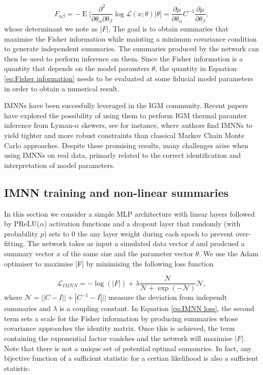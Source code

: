 \begin{equation}\label{eq:Fisher information}
    F_{\alpha \beta} =-\operatorname{E}\bigg[\frac{\partial^2}{\partial\theta_\alpha\partial\theta_\beta}\log \mathcal{L}(x;\theta)\bigg|\theta\bigg]= \frac{\partial \mu}{\partial \theta_\alpha}C^{-1} \frac{\partial \mu}{\partial \theta_\beta},
\end{equation}
whose determinant we note as $|F|$. 
The goal is to obtain summaries that maximise the Fisher information while mainting a minimum covariance condition to generate independent summaries. The summaries produced by the network can then be used to perform inference on them. Since the Fisher information is a quantity that depends on the model paramters $\theta$, the quantity in Equation \ref{eq:Fisher information} needs to be evaluated at some fiducial model parameters in order to obtain a numerical result.

IMNNs have been succesfully leveraged in the IGM community. Recent papers have explored the possibility of using them to perform IGM thermal paramter inference from Lyman-$\alpha$ skewers, see \cite{maitra2024parameterestimationlyalphaforest} for instance, where authors find IMNNs to yield tighter and more robust constraints than classical Markov Chain Monte Carlo approaches. Despite these promising results, many challenges arise when using IMNNs on real data, primarly related to the correct identification and interpretation of model parameters.

\subsection{IMNN training and non-linear summaries}
In this section we consider a simple MLP architecture with linear layers followed by PReLU($\alpha$) activation functions and a dropout layer that randomly (with probability $p$) sets to 0 the any layer weight during each epoch to prevent over-fitting. The network takes as input a simulated data vector $d$ and prodcued a summary vector $x$ of the same size and the parameter vector $\theta$. We use the Adam optimiser to maximise |F| by minimising the following loss function

\begin{equation}\label{eq:IMNN loss}
    \mathcal{L}_{IMNN} = - \log(|F|) + \lambda \frac{\mathcal{N}}{\mathcal{N}+\exp(-\mathcal{N})} \mathcal{N},
\end{equation}
where $\mathcal{N}=||C-I||+|C^{-1}-I|||$ measure the deviation from independt summaries and $\lambda$ is a coupling constant. In Equation \ref{eq:IMNN loss}, the second term sets a scale for the Fisher information by producing summaries whose covariance approaches the identity matrix. Once this is achieved, the term containing the exponential factor vanishes and the network will maximise $|F|$. Note that there is not a unique set of potential optimal sumamries. In fact, any bijective function of a sufficient statistic for a certian likelihood is also a sufficient statistic.

